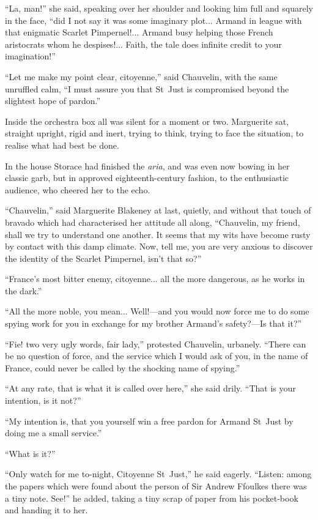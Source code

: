 \enquote{La, man!} she said, speaking over her shoulder and looking him full and squarely in the face, \enquote{did I not say it was some imaginary plot... Armand in league with that enigmatic Scarlet Pimpernel!... Armand busy helping those French aristocrats whom he despises!... Faith, the tale does infinite credit to your imagination!}

\enquote{Let me make my point clear, citoyenne,} said Chauvelin, with the same unruffled calm, \enquote{I must assure you that St~Just is compromised beyond the slightest hope of pardon.}

Inside the orchestra box all was silent for a moment or two. Marguerite sat, straight upright, rigid and inert, trying to think, trying to face the situation, to realise what had best be done.

In the house Storace had finished the \textit{aria}, and was even now bowing in her classic garb, but in approved eighteenth-century fashion, to the enthusiastic audience, who cheered her to the echo.

\enquote{Chauvelin,} said Marguerite Blakeney at last, quietly, and without that touch of bravado which had characterised her attitude all along, \enquote{Chauvelin, my friend, shall we try to understand one another. It seems that my wits have become rusty by contact with this damp climate. Now, tell me, you are very anxious to discover the identity of the Scarlet Pimpernel, isn't that so?}

\enquote{France's most bitter enemy, citoyenne... all the more dangerous, as he works in the dark.}

\enquote{All the more noble, you mean... Well!---and you would now force me to do some spying work for you in exchange for my brother Armand's safety?---Is that it?}

\enquote{Fie! two very ugly words, fair lady,} protested Chauvelin, urbanely. \enquote{There can be no question of force, and the service which I would ask of you, in the name of France, could never be called by the shocking name of spying.}

\enquote{At any rate, that is what it is called over here,} she said drily. \enquote{That is your intention, is it not?}

\enquote{My intention is, that you yourself win a free pardon for Armand St~Just by doing me a small service.}

\enquote{What is it?}

\enquote{Only watch for me to-night, Citoyenne St~Just,} he said eagerly. \enquote{Listen: among the papers which were found about the person of Sir Andrew Ffoulkes there was a tiny note. See!} he added, taking a tiny scrap of paper from his pocket-book and handing it to her.

